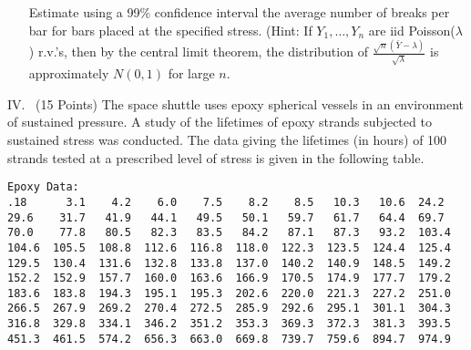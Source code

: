 \documentclass[10pt]{report}
\def\vn{\vskip0mm\noindent}
\begin{document}
\begin{enumerate}
\item[] Estimate using a 99\% confidence interval the average number of breaks per bar for bars placed at the specified stress.
(Hint: If $Y_1,\ldots,Y_n$ are iid
  Poisson($\lambda$) r.v.'s, then by the central limit theorem, the
  distribution of $\frac{\sqrt{n}(\bar Y-\lambda)}{\sqrt{\lambda}}$ is
  approximately $N(0,1)$ for large $n$.
\end{enumerate}
\vfill\newpage
\item[IV.]\ (15 Points) The space shuttle uses epoxy spherical vessels in an environment of sustained pressure.
A study of the lifetimes of epoxy strands subjected to sustained stress was conducted.
The data giving the lifetimes (in hours) of 100 strands tested at a prescribed level of stress is given in the following table.
\vn
\small
\begin{verbatim}
Epoxy Data:
.18      3.1    4.2    6.0    7.5    8.2    8.5   10.3   10.6  24.2
29.6    31.7   41.9   44.1   49.5   50.1   59.7   61.7   64.4  69.7
70.0    77.8   80.5   82.3   83.5   84.2   87.1   87.3   93.2  103.4
104.6  105.5  108.8  112.6  116.8  118.0  122.3  123.5  124.4  125.4
129.5  130.4  131.6  132.8  133.8  137.0  140.2  140.9  148.5  149.2
152.2  152.9  157.7  160.0  163.6  166.9  170.5  174.9  177.7  179.2
183.6  183.8  194.3  195.1  195.3  202.6  220.0  221.3  227.2  251.0
266.5  267.9  269.2  270.4  272.5  285.9  292.6  295.1  301.1  304.3
316.8  329.8  334.1  346.2  351.2  353.3  369.3  372.3  381.3  393.5
451.3  461.5  574.2  656.3  663.0  669.8  739.7  759.6  894.7  974.9
\end{verbatim}
\normalsize
\end{document}
